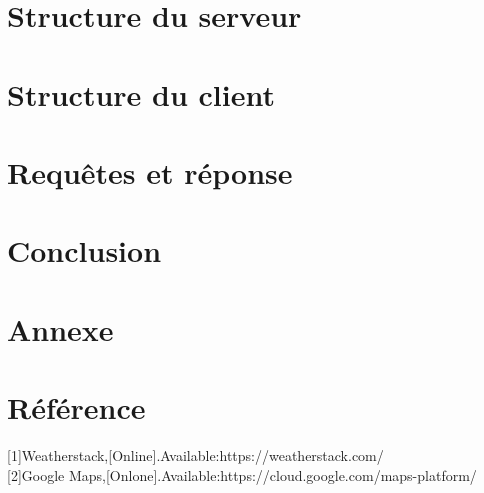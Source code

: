 \documentclass[14px]{article}
\begin{document}
\section{Structure du serveur}

\section{Structure du client}

\section{Requêtes et réponse}

\section{Conclusion}

\section{Annexe}
\begin{figure}
\end{figure}
\section{Référence}
[1]Weatherstack,[Online].Available:https://weatherstack.com/\\

[2]Google Maps,[Onlone].Available:https://cloud.google.com/maps-platform/\\
\end{document}
